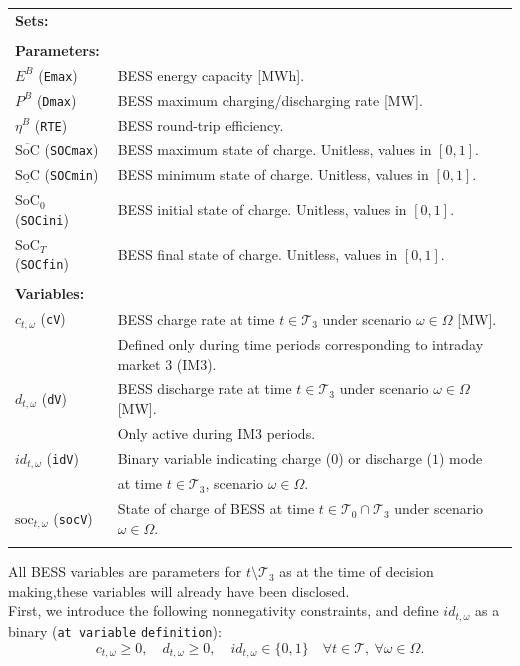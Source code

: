 \documentclass{article}
\newcommand{\SOC}{\text{SoC}}
\newcommand{\soc}{\text{soc}}
\begin{document}
\begin{tabularx}{\textwidth}{l l}
    \textbf{Sets:} \\
 	
    \\
    
    \textbf{Parameters:} \\
	$E^B$ (\verb|Emax|) & BESS energy capacity [MWh].	 \\
	$P^B$ (\verb|Dmax|) & BESS maximum charging/discharging rate [MW]. \\
	$\eta^B$ (\verb|RTE|) & BESS round-trip efficiency. \\
	$\overline{\SOC}$ (\verb|SOCmax|) & BESS maximum state of charge. Unitless, values in $[0, 1]$. \\
	$\underline{\SOC}$ (\verb|SOCmin|) & BESS minimum state of charge. Unitless, values in $[0, 1]$. \\
	$\SOC_0$ (\verb|SOCini|) & BESS initial state of charge. Unitless, values in $[0, 1]$. \\
	$\SOC_T$ (\verb|SOCfin|) & BESS final state of charge. Unitless, values in $[0, 1]$. \\
	\\
       
    \textbf{Variables:} \\
    $c_{t, \omega}$ (\verb|cV|) & BESS charge rate at time $t \in \mathcal{T}_3$ under scenario $\omega \in \Omega$ [MW]. \\
    & Defined only during time periods corresponding to intraday market 3 (IM3). \\
    $d_{t, \omega}$ (\verb|dV|) & BESS discharge rate at time $t \in \mathcal{T}_3$ under scenario $\omega \in \Omega$ [MW]. \\
    & Only active during IM3 periods. \\
    $id_{t, \omega}$ (\verb|idV|) & Binary variable indicating charge ($0$) or discharge ($1$) mode \\
    & at time $t \in \mathcal{T}_3$, scenario $\omega \in \Omega$. \\
    $\soc_{t, \omega}$ (\verb|socV|) & State of charge of BESS at time $t \in \mathcal{T}_0 \cap \mathcal{T}_3$ under scenario $\omega \in \Omega$. \\
	\\
\end{tabularx}
All BESS variables are parameters for $t \setminus \mathcal{T}_3$ as at the time of decision making,these variables will already have been disclosed.
\\
First, we introduce the following nonnegativity  constraints, and define $id_{t, \omega}$ as a binary (\verb|at variable| \verb|definition|):
\begin{equation} \label{dVdCPos}
	c_{t, \omega} \geq 0, \quad d_{t, \omega} \geq 0, \quad id_{t, \omega} \in \{ 0, 1 \} \quad \forall t \in \mathcal{T}, \ \forall \omega \in \Omega.
\end{equation}
\end{document}
